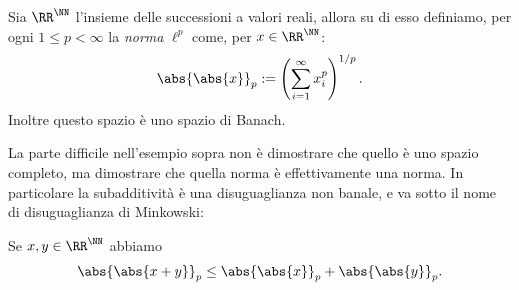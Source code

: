 \documentclass[11pt]{scrartcl}
\begin{document}
	\begin{definition}
		Sia $\RR^\NN$ l'insieme delle successioni a valori reali, allora su di esso definiamo, per ogni $1\le p <\infty$ la \textit{norma} $\ell^p$ come, per $x\in \RR^\NN$:
		$$\abs{\abs{x}}_p:=\left(\sum_{i=1}^{\infty}x_i^p\right)^{1/p}.$$
		Inoltre questo spazio è uno spazio di Banach.
	\end{definition}
	La parte difficile nell'esempio sopra non è dimostrare che quello è uno spazio completo, ma dimostrare che quella norma è effettivamente una norma. In particolare la subadditività è una disuguaglianza non banale, e va sotto il nome di disuguaglianza di Minkowski:
	\begin{theorem}[Minkowski]
		Se $x,y\in \RR^\NN$ abbiamo
		$$\abs{\abs{x+y}}_p\le \abs{\abs{x}}_p+\abs{\abs{y}}_p.$$
	\end{theorem}
	
\end{document}
